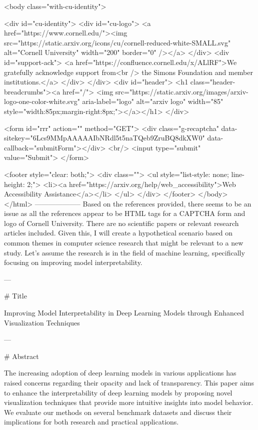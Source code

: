      <body class="with-cu-identity">

       <div id="cu-identity">
         <div id="cu-logo">
           <a href="https://www.cornell.edu/"><img src="https://static.arxiv.org/icons/cu/cornell-reduced-white-SMALL.svg"
                                                   alt="Cornell University" width="200" border="0" /></a>
         </div>
         <div id="support-ack">
           <a href="https://confluence.cornell.edu/x/ALlRF">We gratefully acknowledge support from<br />
             the Simons Foundation and member institutions.</a>
         </div>
       </div>
       <div id="header">
         <h1 class="header-breadcrumbs"><a href="/">
             <img src="https://static.arxiv.org/images/arxiv-logo-one-color-white.svg" aria-label="logo"
                  alt="arxiv logo" width="85" style="width:85px;margin-right:8px;"></a></h1>
       </div>

       <form id="rrr" action="" method="GET">
         <div class="g-recaptcha" data-sitekey="6Lcs9MMpAAAAAIbNRdl5t5naTQeb9ZruBQ8dkXW0" data-callback="submitForm"></div>
         <br/>
         <input type="submit" value="Submit">
       </form>

       <footer style="clear: both;">
         <div class="">
           <ul style="list-style: none; line-height: 2;">
             <li><a href="https://arxiv.org/help/web_accessibility">Web Accessibility Assistance</a></li>
           </ul>
         </div>
       </footer>
        </body>
      </html>
        --------------------
         Based on the references provided, there seems to be an issue as all the references appear to be HTML tags for a CAPTCHA form and logo of Cornell University. There are no scientific papers or relevant research articles included. Given this, I will create a hypothetical scenario based on common themes in computer science research that might be relevant to a new study. Let's assume the research is in the field of machine learning, specifically focusing on improving model interpretability.

---

# Title

Improving Model Interpretability in Deep Learning Models through Enhanced Visualization Techniques

---

# Abstract

The increasing adoption of deep learning models in various applications has raised concerns regarding their opacity and lack of transparency. This paper aims to enhance the interpretability of deep learning models by proposing novel visualization techniques that provide more intuitive insights into model behavior. We evaluate our methods on several benchmark datasets and discuss their implications for both research and practical applications.

